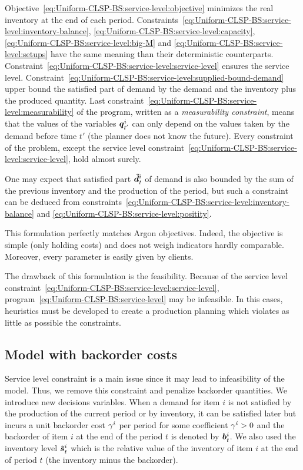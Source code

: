Objective~\eqref{eq:Uniform-CLSP-BS:service-level:objective} minimizes the real inventory at the end of each period.
Constraints~\eqref{eq:Uniform-CLSP-BS:service-level:inventory-balance}, \eqref{eq:Uniform-CLSP-BS:service-level:capacity}, \eqref{eq:Uniform-CLSP-BS:service-level:big-M} and \eqref{eq:Uniform-CLSP-BS:service-level:setups} have the same meaning than their deterministic counterparts.
Constraint~\eqref{eq:Uniform-CLSP-BS:service-level:service-level} ensures the service level.
Constraint~\eqref{eq:Uniform-CLSP-BS:service-level:supplied-bound-demand} upper bound the satisfied part of demand by the demand and the inventory plus the produced quantity.
Last constraint~\eqref{eq:Uniform-CLSP-BS:service-level:measurability} of the program, written as a {\em measurability constraint}, means that the values of the variables $\va\quantity_{t'}^i$ can only depend on the values taken by the demand before time $t'$ (the planner does not know the future).
Every constraint of the problem, except the service level constraint~\eqref{eq:Uniform-CLSP-BS:service-level:service-level}, hold almost surely.


One may expect that satisfied part $\va\supplied_t^i$ of demand is also bounded by the sum of the previous inventory and the production of the period, but such a constraint can be deduced from constraints~\eqref{eq:Uniform-CLSP-BS:service-level:inventory-balance} and \eqref{eq:Uniform-CLSP-BS:service-level:positity}.


This formulation perfectly matches Argon objectives.
Indeed, the objective is simple (only holding costs) and does not weigh indicators hardly comparable.
Moreover, every parameter is easily given by clients.


The drawback of this formulation is the feasibility.
Because of the service level constraint~\eqref{eq:Uniform-CLSP-BS:service-level:service-level}, program~\eqref{eq:Uniform-CLSP-BS:service-level} may be infeasible.
In this cases, heuristics must be developed to create a production planning which violates as little as possible the constraints.



\subsection{Model with backorder costs}
\label{sec:PDP:stochastic:model:backorder}

Service level constraint is a main issue since it may lead to infeasibility of the model.
Thus, we remove this constraint and penalize backorder quantities.
We introduce new decisions variables.
When a demand for item $i$ is not satisfied by the production of the current period or by inventory, it can be satisfied later but incurs a unit backorder cost $\gamma^i$ per period for some coefficient $\gamma^i>0$ and the backorder of item $i$ at the end of the period $t$ is denoted by $\va\backlog_t^i$.
We also used the inventory level $\va\level_t^i$ which is the relative value of the inventory of item $i$ at the end of period $t$ (\ie the inventory minus the backorder).


